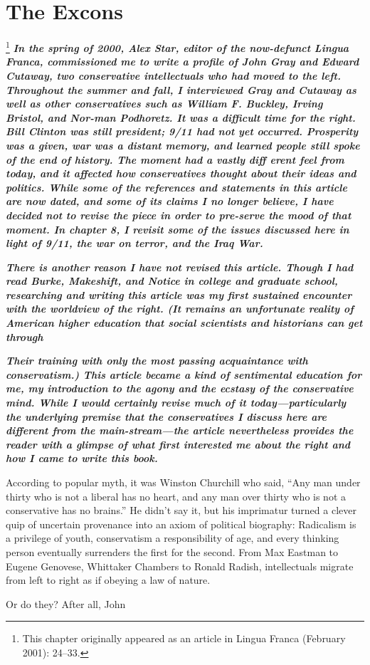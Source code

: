 {\chapter{The Excons} } {\label{The Excons} }{\par}{\textit{	} } {\par}{\par} {\textbf{\textit{	} } } {\par} 
{\footnote{This chapter originally appeared as an article in Lingua Franca (February 2001): 24–33.} }	{\textbf{\textit{In the spring of 2000, Alex Star, editor of the now-defunct Lingua Franca, commissioned me to write a profile of John Gray and Edward Cutaway, two conservative intellectuals who had moved to the left. Throughout the summer and fall, I interviewed Gray and Cutaway as well as other conservatives such as William F. Buckley, Irving Bristol, and Nor-man Podhoretz. It was a difficult time for the right. Bill Clinton was still president; 9/11 had not yet occurred. Prosperity was a given, war was a distant memory, and learned people still spoke of the end of history. The moment had a vastly diff erent feel from today, and it affected how conservatives thought about their ideas and politics. While some of the references and statements in this article are now dated, and some of its claims I no longer believe, I have decided not to revise the piece in order to pre-serve the mood of that moment. In chapter 8, I revisit some of the issues discussed here in light of 9/11, the war on terror, and the Iraq War.} }} {\par} {\textbf{\textit{There is another reason I have not revised this article. Though I had read Burke, Makeshift, and Notice in college and graduate school, researching and writing this article was my first sustained encounter with the worldview of the right. (It remains an unfortunate reality of American higher education that social scientists and historians can get through} }} {\par} {\par} {\textbf{\textit{Their training with only the most passing acquaintance with conservatism.) This article became a kind of sentimental education for me, my introduction to the agony and the ecstasy of the conservative mind. While I would certainly revise much of it today—particularly the underlying premise that the conservatives I discuss here are different from the main-stream—the article nevertheless provides the reader with a glimpse of what first interested me about the right and how I came to write this book.} } }{\par} According to popular myth, it was Winston Churchill who said, “Any man under thirty who is not a liberal has no heart, and any man over thirty who is not a conservative has no brains.” He didn’t say it, but his imprimatur turned a clever quip of uncertain provenance into an axiom of political biography: Radicalism is a privilege of youth, conservatism a responsibility of age, and every thinking person eventually surrenders the first for the second. From Max Eastman to Eugene Genovese, Whittaker Chambers to Ronald Radish, intellectuals migrate from left to right as if obeying a law of nature.{\par} Or do they? After all, John 